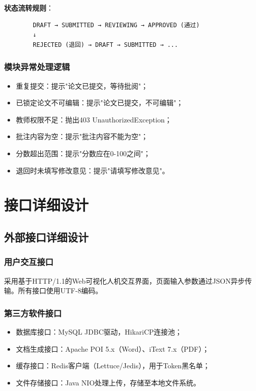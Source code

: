 \documentclass{../template/softeng}
\begin{document}
	\textbf{状态流转规则}：
	\begin{verbatim}
		DRAFT → SUBMITTED → REVIEWING → APPROVED (通过)
		↓
		REJECTED (退回) → DRAFT → SUBMITTED → ...
	\end{verbatim}

	\subsubsection{模块异常处理逻辑}
	\begin{itemize}
		\item 重复提交：提示"论文已提交，等待批阅"；
		\item 已锁定论文不可编辑：提示"论文已提交，不可编辑"；
		\item 教师权限不足：抛出403 UnauthorizedException；
		\item 批注内容为空：提示"批注内容不能为空"；
		\item 分数超出范围：提示"分数应在0-100之间"；
		\item 退回时未填写修改意见：提示"请填写修改意见"。
	\end{itemize}


	\section{接口详细设计}

	\subsection{外部接口详细设计}

	\subsubsection{用户交互接口}
	采用基于HTTP/1.1的Web可视化人机交互界面，页面输入参数通过JSON异步传输。所有接口使用UTF-8编码。

	\subsubsection{第三方软件接口}
	\begin{itemize}
		\item 数据库接口：MySQL JDBC驱动，HikariCP连接池；
		\item 文档生成接口：Apache POI 5.x（Word）、iText 7.x（PDF）；
		\item 缓存接口：Redis客户端（Lettuce/Jedis），用于Token黑名单；
		\item 文件存储接口：Java NIO处理上传，存储至本地文件系统。
	\end{itemize}
\end{document}
